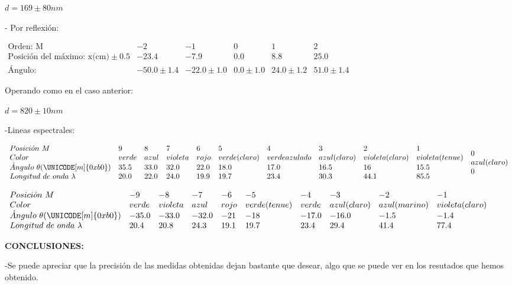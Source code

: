 \documentclass[12pt,thmsa]{article}
\begin{document}
$d=169\pm 80nm$

- Por reflexi\'{o}n:

\vspace{1pt}$
\begin{array}{llllll}
\text{Orden: M} & -2 & -1 & 0 & 1 & 2 \\ 
\text{Posici\'{o}n del m\'{a}ximo: x(cm)}\pm 0.5 & -23.4 & -7.9 & 0.0 & 8.8
& 25.0 \\ 
\text{\'{A}ngulo: } & -50.0\pm 1.4 & -22.0\pm 1.0 & 0.0\pm 1.0 & 24.0\pm 1.2
& 51.0\pm 1.4
\end{array}
$

Operando como en el caso anterior:

$d=820\pm 10nm$

\vspace{1pt}

-Lineas espectrales:

$
\begin{array}{llllllllll}
Posici\acute{o}n\text{ }M & 9 & 8 & 7 & 6 & 5 & 4 & 3 & 2 & 1 \\ 
Color & verde & azul & violeta & rojo & verde(claro) & verdeazulado & 
azul(claro) & violeta(claro) & violeta(tenue) \\ 
\acute{A}ngulo\text{ }\theta (\UNICODE[m]{0xb0}) & 35.5 & 33.0 & 32.0 & 22.0
& 18.0 & 17.0 & 16.5 & 16 & 15.5 \\ 
Longitud\text{ }de\text{ }onda\text{ }\lambda & 20.0 & 22.0 & 24.0 & 19.9 & 
19.7 & 23.4 & 30.3 & 44.1 & 85.5
\end{array}
\begin{array}{l}
0 \\ 
azul(claro) \\ 
0
\end{array}
$

$
\begin{array}{llllllllll}
Posici\acute{o}n\text{ }M & -9 & -8 & -7 & -6 & -5 & -4 & -3 & -2 & -1 \\ 
Color & verde & violeta & azul & rojo & verde(tenue) & verde & azul(claro) & 
azul(marino) & violeta(claro) \\ 
\acute{A}ngulo\text{ }\theta (\UNICODE[m]{0xb0}) & -35.0 & -33.0 & -32.0 & 
-21 & -18 & -17.0 & -16.0 & -1.5 & -1.4 \\ 
Longitud\text{ }de\text{ }onda\text{ }\lambda & 20.4 & 20.8 & 24.3 & 19.1 & 
19.7 & 23.4 & 29.4 & 41.4 & 77.4
\end{array}
$

\textbf{CONCLUSIONES:}

-Se puede apreciar que la precisi\'{o}n de las medidas obtenidas dejan
bastante que desear, algo que se puede ver en los resutados que hemos
obtenido.
\end{document}
